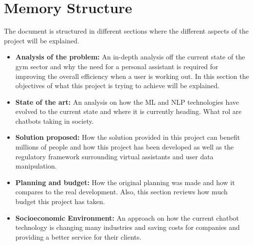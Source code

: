 \section{Memory Structure}\label{sec:chap1_mem-str}
The document is structured in different sections where the different aspects of the project will be explained.
\begin{itemize}
	\item{\textbf{Analysis of the problem:} An in-depth analysis off the current state of the gym sector and why the need for a personal assistant is required for improving the overall efficiency when a user is working out. In this section the objectives of what this project is trying to achieve will be explained.}
	\item{\textbf{State of the art:} An analysis on how the ML and NLP technologies have evolved to the current state and where it is currently heading. What rol are chatbots taking in society.}
	\item{\textbf{Solution proposed:} How the solution provided in this project can benefit millions of people and how this project has been developed as well as the regulatory framework surrounding virtual assistants and user data manipulation.}
	\item{\textbf{Planning and budget:} How the original planning was made and how it compares to the real development. Also, this section reviews how much budget this project has taken.}
	\item{\textbf{Socioeconomic Environment:} An approach on how the current chatbot technology is changing many industries and saving costs for companies and providing a better service for their clients.}
\end{itemize}















